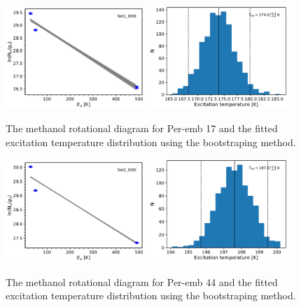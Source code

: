 \documentclass[twocolumn]{aastex62}
\begin{document}
\begin{figure}[htbp!]
  \centering
  \includegraphics[width=0.47\textwidth]{Set1_ID06.pdf}
  \includegraphics[width=0.47\textwidth]{Set1_ID06_rot_temps.pdf}
  \caption{The methanol rotational diagram for Per-emb 17 and the fitted excitation temperature distribution using the bootstraping method.}
  \label{}
\end{figure}

\begin{figure}[htbp!]
  \centering
  \includegraphics[width=0.47\textwidth]{Set2_ID00.pdf}
  \includegraphics[width=0.47\textwidth]{Set2_ID00_rot_temps.pdf}
  \caption{The methanol rotational diagram for Per-emb 44 and the fitted excitation temperature distribution using the bootstraping method.}
  \label{}
\end{figure}
\end{document}
